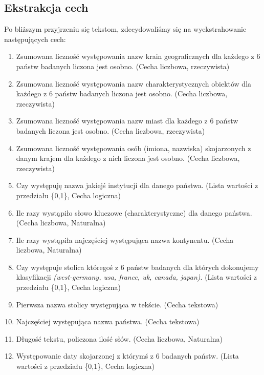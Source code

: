 \documentclass{article}
\begin{document}
\subsection{Ekstrakcja cech}
Po bliższym przyjrzeniu się tekstom, zdecydowaliśmy się na wyekstrahowanie następujących cech:

\begin{enumerate}
    \item \label{licznosc.krainy} Zsumowana liczność występowania nazw krain geograficznych dla każdego z 6 państw badanych liczona jest osobno. (Cecha liczbowa, rzeczywista)
    \item \label{licznosc.obiektow} Zsumowana liczność występowania nazw charakterystycznych obiektów dla każdego z 6 państw badanych liczona jest osobno. (Cecha liczbowa, rzeczywista)
    \item \label{licznosc.miast} Zsumowana liczność występowania nazw miast dla każdego z 6 państw badanych liczona jest osobno. (Cecha liczbowa, rzeczywista)
    \item \label{licznosc.osob} Zsumowana liczność występowania osób (imiona, nazwiska) skojarzonych z danym krajem dla każdego z nich liczona jest osobno. (Cecha liczbowa, rzeczywista)
    \item \label{czy.instytucja} Czy występuję nazwa jakiejś instytucji dla danego państwa. (Lista wartości z przedziału \{0,1\}, Cecha logiczna)
    \item \label{ile.slowo} Ile razy wystąpiło słowo kluczowe (charakterystyczne) dla danego państwa. (Cecha liczbowa, Naturalna)
    \item \label{ile.kontynent} Ile razy wystąpiła najczęściej występująca nazwa kontynentu. (Cecha liczbowa, Naturalna)
    \item \label{czy.stolica} Czy występuje stolica któregoś z 6 państw badanych dla których dokonujemy klasyfikacji \textit{(west-germany, usa, france, uk, canada, japan)}. (Lista wartości z przedziału \{0,1\}, Cecha logiczna)
    \item Pierwsza nazwa stolicy występująca w tekście. (Cecha tekstowa)
    \item Najczęściej występująca nazwa państwa. (Cecha tekstowa)
    \item \label{ile.dlugosc} Długość tekstu, policzona ilość słów. (Cecha liczbowa, Naturalna)
    \item \label{czy.data} Występowanie daty skojarzonej z którymś z 6 badanych państw. (Lista wartości z przedziału \{0,1\}, Cecha logiczna)
\end{enumerate}
\end{document}
